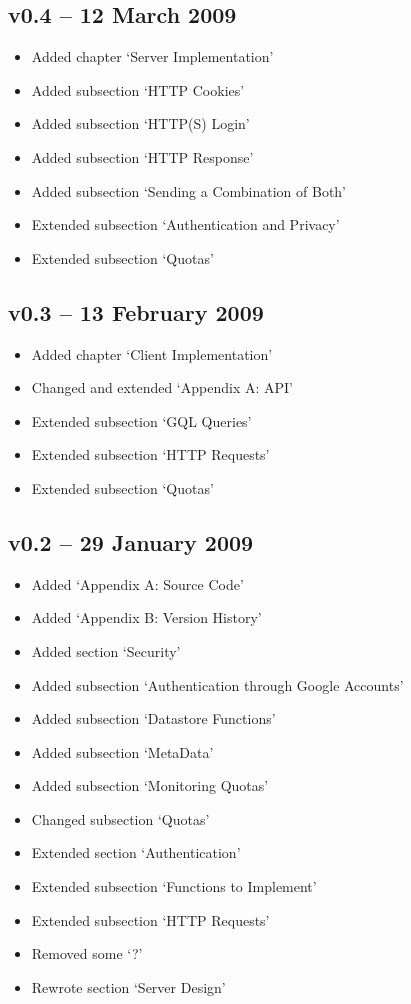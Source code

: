 \subsection*{v0.4 -- 12 March 2009}
\begin{itemize}
  \item Added chapter `Server Implementation'
  \item Added subsection `HTTP Cookies'
  \item Added subsection `HTTP(S) Login'
  \item Added subsection `HTTP Response'
  \item Added subsection `Sending a Combination of Both'
  \item Extended subsection `Authentication and Privacy'
  \item Extended subsection `Quotas'
\end{itemize}

\subsection*{v0.3 -- 13 February 2009}
\begin{itemize}
  \item Added chapter `Client Implementation'
  \item Changed and extended `Appendix A: API'
  \item Extended subsection `GQL Queries'
  \item Extended subsection `HTTP Requests'
  \item Extended subsection `Quotas'
\end{itemize}

\subsection*{v0.2 -- 29 January 2009}
\begin{itemize}
  \item Added `Appendix A: Source Code'
  \item Added `Appendix B: Version History'
  \item Added section `Security'
  \item Added subsection `Authentication through Google Accounts'
  \item Added subsection `Datastore Functions'
  \item Added subsection `MetaData'
  \item Added subsection `Monitoring Quotas'
  \item Changed subsection `Quotas'
  \item Extended section `Authentication'
  \item Extended subsection `Functions to Implement'
  \item Extended subsection `HTTP Requests'
  \item Removed some `?'
  \item Rewrote section `Server Design'
\end{itemize}

